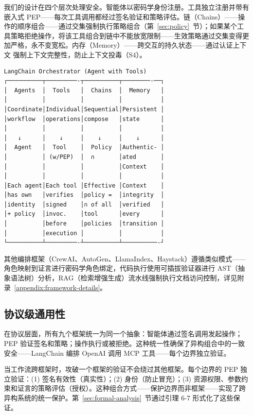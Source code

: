 我们的设计在四个层次处理安全。智能体以密码学身份注册。工具独立注册并带有嵌入式 PEP——每次工具调用都经过签名验证和策略评估。链（Chains）——操作的顺序组合——通过交集强制执行策略组合（第~\ref{sec:policy}~节）；如果某个工具策略拒绝操作，将该工具组合到链中不能放宽限制——生效策略通过交集变得更加严格，永不变宽松。内存（Memory）——跨交互的持久状态——通过认证上下文 \cite{rajagopalan2025prompts} 强制上下文完整性，防止上下文投毒（S4）。

\noindent\begin{minipage}[t]{\columnwidth}
{\scriptsize
\begin{verbatim}
LangChain Orchestrator (Agent with Tools)
┌──────────┬─────────-┬──────────┬────────-──┐
│  Agents  │  Tools   │  Chains  │  Memory   │
│          │          │          │           │
│Coordinate│Individual│Sequential│Persistent │
│workflow  │operations│compose   │state      │
│          │          │          │           │
│   ↓      │    ↓     │    ↓     │    ↓      │
│  Agent   │  Tool    │  Policy  │Authentic- │
│          │ (w/PEP)  │  ∩       │ated       │
│          │          │          │Context    │
│          │          │          │           │
│Each agent│Each tool │Effective │Context    │
│has own   │verifies  │policy =  │integrity  │
│identity  │signed    │∩ of all  │verified   │
│+ policy  │invoc.    │tool      │every      │
│          │before    │policies  │transition │
│          │execution │          │           │
└──────────┴─────────-┴──────────┴──────────-┘
\end{verbatim}}
\end{minipage}


其他编排框架（CrewAI、AutoGen、LlamaIndex、Haystack）遵循类似模式——角色映射到证言进行密码学角色绑定，代码执行使用可插拔验证器进行 AST（抽象语法树）分析，RAG（检索增强生成）流水线强制执行文档访问控制，详见附录~\ref{appendix:framework-details}。

\subsection{协议级通用性}
在协议层面，所有九个框架统一为同一个抽象：智能体通过签名调用发起操作；PEP 验证签名和策略；操作执行或被拒绝。这种统一性确保了异构组合中的一致安全——LangChain 编排 OpenAI 调用 MCP 工具——每个边界独立验证。

当工作流跨框架时，攻破一个框架的验证不会绕过其他框架。每个边界的 PEP 独立验证：(1) 签名有效性（真实性）；(2) 身份（防止冒充）；(3) 资源权限、参数约束和证言的策略评估（授权）。这种组合方式——保护边界而非框架——实现了跨异构系统的统一保护。第~\ref{sec:formal-analysis}~节通过引理 6-7 形式化了这些保证。



